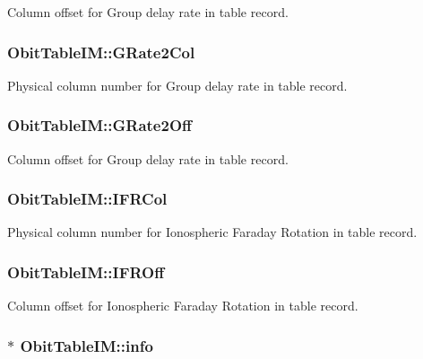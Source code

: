 Column offset for Group delay rate in table record. 

\subsubsection{ {\bf Obit\-Table\-IM::GRate2Col}}\label{structObitTableIM_o62}


Physical column number for Group delay rate in table record. 

\subsubsection{ {\bf Obit\-Table\-IM::GRate2Off}}\label{structObitTableIM_o61}


Column offset for Group delay rate in table record. 

\subsubsection{ {\bf Obit\-Table\-IM::IFRCol}}\label{structObitTableIM_o40}


Physical column number for Ionospheric Faraday Rotation in table record. 

\subsubsection{ {\bf Obit\-Table\-IM::IFROff}}\label{structObitTableIM_o39}


Column offset for Ionospheric Faraday Rotation in table record. 

\subsubsection{$\ast$ {\bf Obit\-Table\-IM::info}}\label{structObitTableIM_o5}


